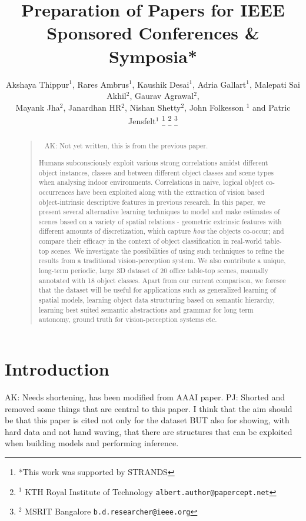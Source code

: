 \documentclass[letterpaper, 10 pt, conference]{ieeeconf}  %
\title{\LARGE \bf
Preparation of Papers for IEEE Sponsored Conferences \& Symposia*
}
\author{Akshaya Thippur$^{1}$, Rares Ambrus$^{1}$, Kaushik Desai$^{1}$, Adria Gallart$^{1}$, Malepati Sai Akhil$^{2}$, Gaurav Agrawal$^{2}$,\\Mayank Jha$^{2}$, Janardhan HR$^{2}$, Nishan Shetty$^{2}$, John Folkesson $^{1}$ and Patric Jensfelt$^{1}$%
\thanks{*This work was supported by STRANDS}%
\thanks{$^{1}$ KTH Royal Institute of Technology
        {\tt\small albert.author@papercept.net}}%
\thanks{$^{2}$ MSRIT Bangalore
        {\tt\small b.d.researcher@ieee.org}}%
}
\begin{document}
\maketitle
\thispagestyle{empty}
\pagestyle{empty}

\begin{abstract}
\begin{quote}\
{\color{blue} AK: Not yet written, this is from the previous paper.}

Humans subconsciously exploit various strong correlations amidst different object instances, classes and between different object classes and scene types when analysing indoor environments. Correlations in naive, logical object co-occurrences have been exploited along with the extraction of vision based object-intrinsic descriptive features in previous research. In this paper, we present several alternative learning techniques to model and make estimates of scenes based on a variety of spatial relations - geometric extrinsic features with different amounts of discretization, which capture \textit{how} the objects co-occur; and compare their efficacy in the context of object classification in real-world table-top scenes. We investigate the possibilities of using such techniques to refine the results from a traditional vision-perception system. We also contribute a unique, long-term periodic, large 3D dataset of 20 office table-top scenes, manually annotated with 18 object classes. Apart from our current comparison, we foresee that the dataset will be useful for applications such as generalized learning of spatial models, learning object data structuring based on semantic hierarchy, learning best suited semantic abstractions and grammar for long term autonomy, ground truth for vision-perception systems etc.

\end{quote}
\end{abstract}


\section{Introduction}
\label{sec:Introduction}

{\color{blue} AK: Needs shortening, has been modified from AAAI paper.}
{\color{red} PJ: Shorted and removed some things that are central to this paper. I think that the aim should be that this paper is cited not only for the dataset BUT also for showing, with hard data and not hand waving, that there are structures that can be exploited when building models and performing inference.}
\end{document}

